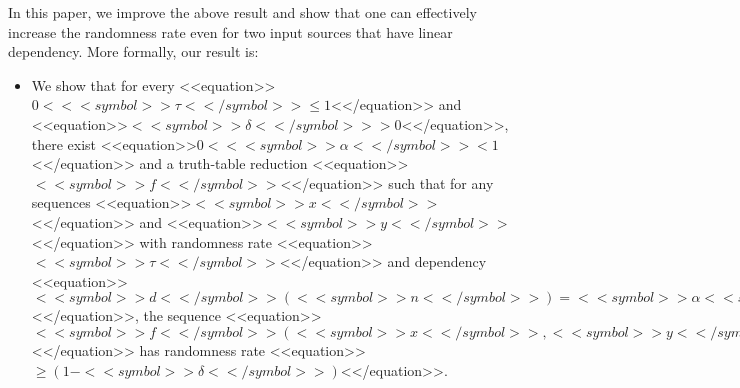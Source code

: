 \documentclass[proceedings]{stacs}
\begin{document}
In this paper, we improve the above result and show that one can effectively increase the randomness rate even for two  input sources that have linear dependency. More formally, our result is:
\begin{itemize}
\item[(1)] We show that for every <<equation>>$0< <<symbol>>\tau <</symbol>>\leq 1$<</equation>> and <<equation>>$<<symbol>>\delta <</symbol>>> 0$<</equation>>, there exist <<equation>>$0< <<symbol>>\alpha <</symbol>>< 1$<</equation>> and a truth-table reduction <<equation>>$<<symbol>>f<</symbol>>$<</equation>> such that for any sequences <<equation>>$<<symbol>>x<</symbol>>$<</equation>> and <<equation>>$<<symbol>>y<</symbol>>$<</equation>> with randomness rate <<equation>>$<<symbol>>\tau<</symbol>>$<</equation>> and dependency <<equation>>$<<symbol>>d<</symbol>>(<<symbol>>n<</symbol>>) = <<symbol>>\alpha  <<symbol>><</symbol>>n<</symbol>>$<</equation>>, the sequence <<equation>>$<<symbol>>f<</symbol>>(<<symbol>>x<</symbol>>,<<symbol>>y<</symbol>>)$<</equation>> has randomness rate <<equation>>$\geq (1 - <<symbol>>\delta<</symbol>>)$<</equation>>.

\end{itemize}
\end{document}
